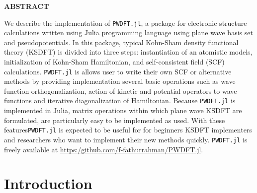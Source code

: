 \documentclass[a0,landscape]{a0poster}
\begin{document}
\begin{multicols}{3}


\color{Navy} %

\begin{minipage}[b]{1.0\linewidth}
\Large

{\centering \textbf{ABSTRACT} \par}

We describe the implementation of \texttt{PWDFT.jl}, a package for electronic
structure calculations written using Julia programming language using
plane wave basis set and pseudopotentials.
In this package, typical Kohn-Sham density functional theory (KSDFT) is divided into three
steps: instantiation of an atomistic models, initialization of Kohn-Sham
Hamiltonian, and self-consistent field (SCF) calculations.
\texttt{PWDFT.jl} is allows user to write their own SCF or alternative methods
by providing implementation several basic operations such as wave function
orthogonalization, action of kinetic and potential operators
to wave functions and iterative diagonalization
of Hamiltonian. Because \texttt{PWDFT.jl} is implemented in Julia, matrix operations
within which plane wave KSDFT are formulated, are particularly easy to be implemented
as used.
With these features\texttt{PWDFT.jl} is expected to be useful for for beginners KSDFT
implementers and researchers who want to implement their new methods quickly.
\texttt{PWDFT.jl} is freely available at
\url{https:/github.com/f-fathurrahman/PWDFT.jl}.
\end{minipage}




\color{SaddleBrown} %


\section*{Introduction}


\end{multicols}
\end{document}
